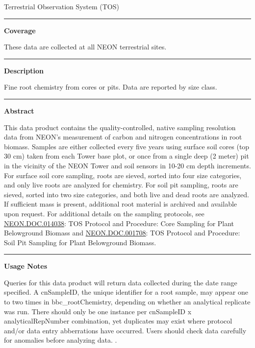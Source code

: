 \documentclass[]{article}
\begin{document}
Terrestrial Observation System (TOS)

\begin{center}\rule{0.5\linewidth}{\linethickness}\end{center}

\textbf{Coverage}

These data are collected at all NEON terrestrial sites.

\begin{center}\rule{0.5\linewidth}{\linethickness}\end{center}

\textbf{Description}

Fine root chemistry from cores or pits. Data are reported by size class.

\begin{center}\rule{0.5\linewidth}{\linethickness}\end{center}

\textbf{Abstract}

This data product contains the quality-controlled, native sampling
resolution data from NEON's measurement of carbon and nitrogen
concentrations in root biomass. Samples are either collected every five
years using surface soil cores (top 30 cm) taken from each Tower base
plot, or once from a single deep (2 meter) pit in the vicinity of the
NEON Tower and soil sensors in 10-20 cm depth increments. For surface
soil core sampling, roots are sieved, sorted into four size categories,
and only live roots are analyzed for chemistry. For soil pit sampling,
roots are sieved, sorted into two size categories, and both live and
dead roots are analyzed. If sufficient mass is present, additional root
material is archived and available upon request. For additional details
on the sampling protocols, see
\href{http://data.neonscience.org/api/v0/documents/NEON.DOC.014038vE}{NEON.DOC.014038}:
TOS Protocol and Procedure: Core Sampling for Plant Belowground Biomass
and
\href{http://data.neonscience.org/api/v0/documents/NEON.DOC.001708vA}{NEON.DOC.001708}:
TOS Protocol and Procedure: Soil Pit Sampling for Plant Belowground
Biomass.

\begin{center}\rule{0.5\linewidth}{\linethickness}\end{center}

\textbf{Usage Notes}

Queries for this data product will return data collected during the date
range specified. A cnSampleID, the unique identifier for a root sample,
may appear one to two times in bbc\_rootChemistry, depending on whether
an analytical replicate was run. There should only be one instance per
cnSampleID x analyticalRepNumber combination, yet duplicates may exist
where protocol and/or data entry abberrations have occurred. Users
should check data carefully for anomalies before analyzing data.
\newpage
.
\end{document}
